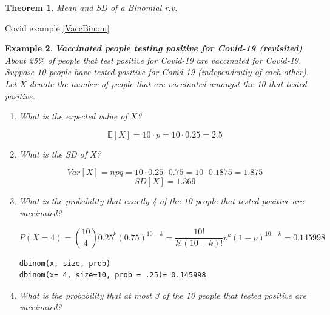 \documentclass[12pt]{amsart}
\newtheorem{theorem}{Theorem}[section]
\newtheorem{example}[theorem]{Example}
\begin{document}
{\begin{theorem}{Mean and SD of a Binomial r.v.}
\end{theorem}


\color{blue}
Covid example \ref{VaccBinom}
\color{black}




\begin{example}\label{VaccBinom10}  \textbf{Vaccinated people testing positive for Covid-19 (revisited)} \newline
About 25\% of people that test positive for Covid-19 are vaccinated for Covid-19.\newline
Suppose 10 people have tested positive for Covid-19 (independently of each other). \newline
Let $X$ denote the number of people that are vaccinated amongst the 10 that tested positive.

\begin{enumerate}


\item What is the expected value of $X$?

\vspace{1.5cm}
\color{blue}
$$\mathbb{E}[X] = 10\cdot p = 10\cdot0.25 = 2.5$$
\color{black}

\item What is the SD of $X$?

\vspace{2cm}
\color{blue}
$$Var[X] = npq = 10\cdot0.25\cdot0.75 = 10\cdot0.1875 = 1.875$$
$$SD[X] = 1.369$$

\color{black}




\newpage

\item What is the probability that exactly 4 of the 10 people that tested positive are vaccinated?

\color{blue}
$$
P(X = 4) = {10\choose 4}0.25^k(0.75)^{10-k} = \frac{10!}{k!(10-k)!}p^k(1-p)^{10-k} = 0.145998
$$
\vspace{1cm}
\begin{verbatim}
dbinom(x, size, prob) 
dbinom(x= 4, size=10, prob = .25)= 0.145998
\end{verbatim}
\color{black}


\item What is the probability that at most 3 of the 10 people that tested positive are vaccinated?


\end{enumerate}
\end{example}}
\end{document}

